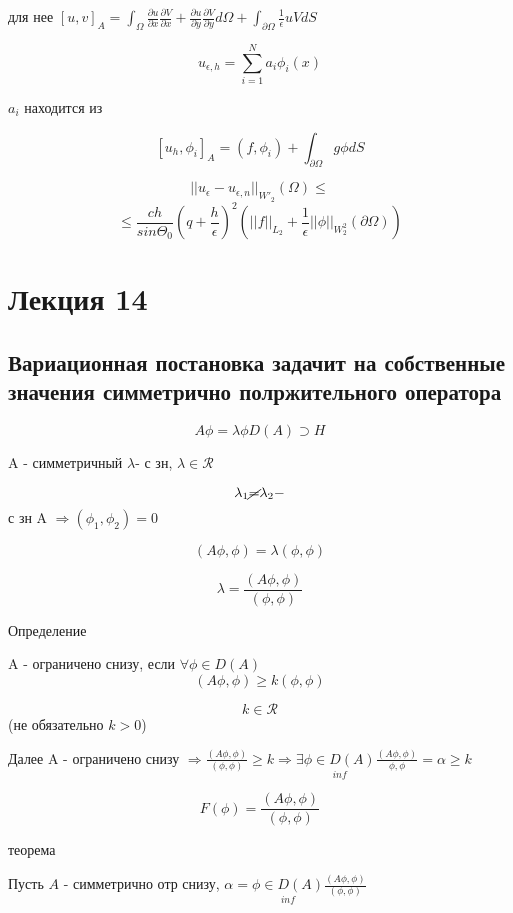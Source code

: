 \documentclass[12pt, a4paper]{article}
\begin{document}
для нее $ [u, v]_A = \int_{\Omega}^{} \frac{\partial u}{\partial x} \frac{\partial V}{\partial x} + \frac{\partial u}{\partial y} \frac{\partial V}{\partial y} d\Omega + \int_{\partial \Omega}^{} \frac{1}{\epsilon} u V dS $

\[ u_{\epsilon, h} = \sum_{i=1}^{N} a_i \phi_i(x) \]

$ a_i $ находится из

\[ [u_h, \phi_i]_A = (f, \phi_i) + \int_{\partial \Omega}^{}g \phi dS \]

\[ ||u_\epsilon - u_{\epsilon, n} ||_{W'}_2 (\Omega) \leq \]
\[ \leq \frac{ch}{sin \Theta_0} {(q + \frac{h}{\epsilon})}^2 ({||f||}_{L_2} + \frac{1 }{\epsilon} ||\phi||_{W_2^2} (\partial \Omega )) \]

\section{Лекция 14}

\subsection{Вариационная постановка задачит на собственные значения симметрично полржительного оператора}

\[ A \phi = \lambda \phi D(A) \supset H \label{eq:14_1}\]

A - симметричный $ \lambda  $- с зн, $ \lambda \in \mathcal{R} $

\[ \lambda_1 \cancel{=} \lambda_2 - \] с зн A $ \Rightarrow (\phi_1, \phi_2) = 0$

\[ (A\phi, \phi) = \lambda (\phi, \phi) \]

\[ \lambda = \frac{(A\phi, \phi)}{(\phi, \phi)} \label{eq:14_2} \]

Определение

A - ограничено снизу, если $ \forall \phi \in D(A) $
\[ (A\phi, \phi) \geq k(\phi, \phi)  \label{eq:14_3}\]

\[ k\in \mathcal{R}  \] (не обязательно $ k>0 $)

Далее A - ограничено снизу $ \Rightarrow  \frac{(A \phi, \phi)}{(\phi, \phi)} \geq k \Rightarrow \exists \underset{inf}{\phi \in D(A)} \frac{(A\phi, \phi)}{\phi, \phi} = \alpha \geq k$

\[ F(\phi) = \frac{(A \phi, \phi)}{(\phi, \phi)} \label{eq:14_4} \]

теорема

Пусть $ A $ - симметрично отр снизу, $ \alpha = \underset{inf}{\phi \in D(A)} \frac{(A \phi, \phi)}{(\phi, \phi)} $
\end{document}
